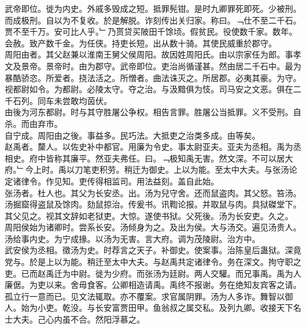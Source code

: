 \documentclass{zhvt-classic}
\begin{document}
\hspace*{2em}武帝即位。徙为内史。外戚多毁成之短。抵罪髡钳。是时九卿罪死即死。少被刑。而成极刑。自以为不复收。於是解脱。诈刻传出关归家。称曰。﹁仕不至二千石。贾不至千万。安可比人乎。﹂乃贳贷买陂田千馀顷。假贫民。役使数千家。数年。会赦。致产数千金。为任侠。持吏长短。出从数十骑。其使民威重於郡守。\\
\hspace*{2em}周阳由者。其父赵兼以淮南王舅父侯周阳。故因姓周阳氏。由以宗家任为郎。事孝文及景帝。景帝时。由为郡守。武帝即位。吏治尚循谨甚。然由居二千石中。最为暴酷骄恣。所爱者。挠法活之。所憎者。曲法诛灭之。所居郡。必夷其豪。为守。视都尉如令。为都尉。必陵太守。夺之治。与汲黯俱为忮。司马安之文恶。俱在二千石列。同车未尝敢均茵伏。\\
\hspace*{2em}由後为河东都尉。时与其守胜屠公争权。相告言罪。胜屠公当抵罪。义不受刑。自杀。而由弃市。\\
\hspace*{2em}自宁成。周阳由之後。事益多。民巧法。大抵吏之治类多成。由等矣。\\
\hspace*{2em}赵禹者。斄人。以佐史补中都官。用廉为令史。事太尉亚夫。亚夫为丞相。禹为丞相史。府中皆称其廉平。然亚夫弗任。曰。﹁极知禹无害。然文深。不可以居大府。﹂今上时。禹以刀笔吏积劳。稍迁为御史。上以为能。至太中大夫。与张汤论定诸律令。作见知。吏传得相监司。用法益刻。盖自此始。\\
\hspace*{2em}张汤者。杜人也。其父为长安丞。出。汤为兒守舍。还而鼠盗肉。其父怒。笞汤。汤掘窟得盗鼠及馀肉。劾鼠掠治。传爰书。讯鞫论报。并取鼠与肉。具狱磔堂下。其父见之。视其文辞如老狱吏。大惊。遂使书狱。父死後。汤为长安吏。久之。\\
\hspace*{2em}周阳侯始为诸卿时。尝系长安。汤倾身为之。及出为侯。大与汤交。遍见汤贵人。汤给事内史。为宁成掾。以汤为无害。言大府。调为茂陵尉。治方中。\\
\hspace*{2em}武安侯为丞相。徵汤为史。时荐言之天子。补御史。使案事。治陈皇后蛊狱。深竟党与。於是上以为能。稍迁至太中大夫。与赵禹共定诸律令。务在深文。拘守职之吏。已而赵禹迁为中尉。徙为少府。而张汤为廷尉。两人交驩。而兄事禹。禹为人廉倨。为吏以来。舍毋食客。公卿相造请禹。禹终不报谢。务在绝知友宾客之请。孤立行一意而已。见文法辄取。亦不覆案。求官属阴罪。汤为人多诈。舞智以御人。始为小吏。乾没。与长安富贾田甲。鱼翁叔之属交私。及列九卿。收接天下名士大夫。己心内虽不合。然阳浮慕之。\\
\end{document}
